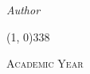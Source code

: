 \begin{titlepage}
\begin{center}
\begin{large}
\vspace{0pt} 

\begin{flushright}
\textit{Author}\\ 
\vspace{5pt} 
\myName
\end{flushright}
\end{large}

\vspace{1pt}

\line(1, 0){338} \\
\begin{normalsize}
\textsc{Academic Year \myAA}
\end{normalsize}

\end{center}
\end{titlepage} 